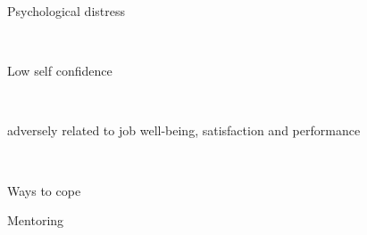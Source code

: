\documentclass[aspectratio=169]{beamer}
\begin{document}
\begin{frame}
  \begin{center}
    \Huge Psychological distress

    \\ \small \cite{hh15}
  \end{center}
\end{frame}

\begin{frame}
  \begin{center}
    \Huge Low self confidence

    \\ \small \cite{hh15}
  \end{center}
\end{frame}

\begin{frame}
  \begin{center}
    \Huge adversely related to job well-being, satisfaction and performance

    \\ \small \cite{hh15}
  \end{center}
\end{frame}

\begin{frame}
  \begin{center}
    \Huge Ways to cope
  \end{center}
\end{frame}

\begin{frame}
  \begin{center}
    \Huge Mentoring
  \end{center}
\end{frame}

\begin{frame}
  \begin{center}
    \Huge
  \end{center}
\end{frame}

\begin{frame}
  \begin{center}
    \Huge
  \end{center}
\end{frame}

\begin{frame}
  \begin{center}
    \Huge
  \end{center}
\end{frame}
\end{document}
